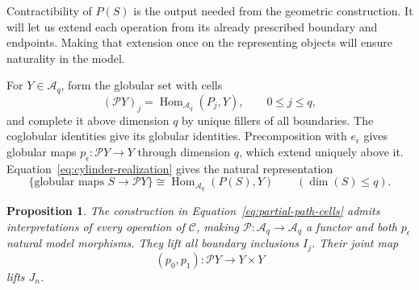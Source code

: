 \documentclass[11pt,letterpaper]{article}
\numberwithin{equation}{section}
\theoremstyle{plain}
\newtheorem{proposition}[theorem]{Proposition}
\theoremstyle{definition}
\theoremstyle{remark}
\begin{document}
Contractibility of \(P(S)\) is the output needed from the geometric
construction.  It will let us extend each operation from its already
prescribed boundary and endpoints.  Making that extension once on the
representing objects will ensure naturality in the model.

For \(Y\in\mathcal A_q\), form the globular set with cells
\begin{equation}\label{eq:partial-path-cells}
           (\mathcal P Y)_j=\operatorname{Hom}_{\mathcal A_q}(P_j,Y),
                     \qquad 0\le j\le q,
\end{equation}
and complete it above dimension \(q\) by unique fillers of all
boundaries.  The coglobular identities give its globular identities.
Precomposition with \(e_\epsilon\) gives globular maps
\(p_\epsilon:\mathcal P Y\to Y\) through dimension \(q\),
which extend uniquely above it.  Equation~\eqref{eq:cylinder-realization}
gives the natural representation
\begin{equation}\label{eq:partial-path-tuples}
 \{\text{globular maps }S\to\mathcal P Y\}
       \cong\operatorname{Hom}_{\mathcal A_q}(P(S),Y)
             \qquad(\dim(S)\le q).
\end{equation}

\begin{proposition}\label{prop:partial-path}
The construction in Equation~\eqref{eq:partial-path-cells} admits
interpretations of every operation of \(\mathcal C\), making
\(\mathcal P:\mathcal A_q\to\mathcal A_q\) a functor and
both \(p_\epsilon\) natural model morphisms.  They lift all
boundary inclusions \(I_j\).  Their joint map
\[
              (p_0,p_1):\mathcal P Y\longrightarrow Y\times Y
\]
lifts \(J_n\).
\end{proposition}
\end{document}

